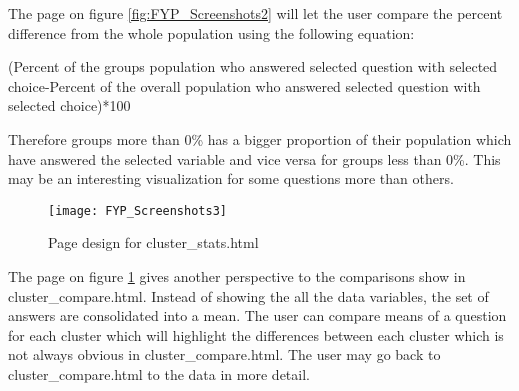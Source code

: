 The page on figure \ref{fig:FYP_Screenshots2} will let the user compare the percent difference from the whole population using the following equation:\par

(Percent of the group\textquotesingle s population who answered selected question with selected choice-Percent of the overall population who answered selected question with selected choice)*100\par

Therefore groups more than 0\% has a bigger proportion of their population which have answered the selected variable and vice versa for groups less than 0\%. This may be an interesting visualization for some questions more than others.

\begin{figure}[h]
\centering
\texttt{[image: FYP\_Screenshots3]}
\caption{Page design for cluster\_stats.html}
\label{fig:FYP_Screenshots3}
\end{figure}

The page on figure \ref{fig:FYP_Screenshots3} gives another perspective to the comparisons show in cluster\_compare.html. Instead of showing the all the data variables, the set of answers are consolidated into a mean. The user can compare means of a question for each cluster which will highlight the differences between each cluster which is not always obvious in cluster\_compare.html. The user may go back to cluster\_compare.html to the data in more detail.
